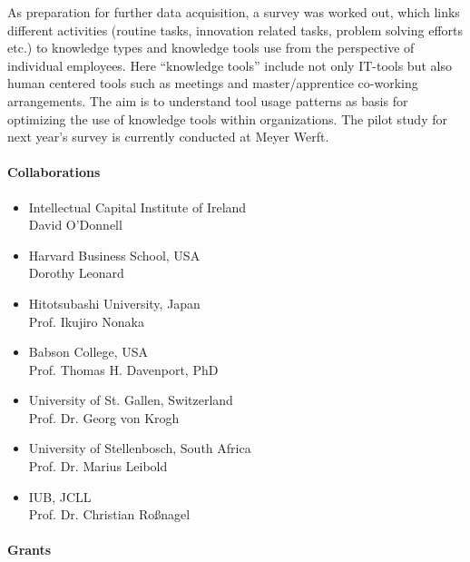  As preparation for further data acquisition, a survey was worked out, which links different activities (routine tasks, innovation related tasks, problem solving efforts etc.) to knowledge types and knowledge tools use from the perspective of individual employees. Here ``knowledge tools'' include not only IT-tools but also human centered tools such as meetings and master/apprentice co-working arrangements. The aim is to understand tool usage patterns as basis for optimizing the use of knowledge tools within organizations. The pilot study for next year's survey is currently conducted at Meyer Werft.

\newpage
\paragraph{Collaborations}
\begin{itemize}
\item Intellectual Capital Institute of Ireland  \\ David O'Donnell 
\item Harvard Business School, USA \\  Dorothy Leonard
\item Hitotsubashi University, Japan \\ Prof. Ikujiro Nonaka
\item Babson College, USA \\  Prof. Thomas H. Davenport, PhD
\item University of St. Gallen, Switzerland \\  Prof. Dr. Georg von Krogh
\item University of Stellenbosch, South Africa \\  Prof. Dr. Marius Leibold
\item IUB, JCLL \\  Prof. Dr. Christian Ro\ss nagel
\end{itemize}

\begin{bibunit}[apalike]
\nocite{*}
\putbib[profSvenVoelpel1]
\end{bibunit}


\paragraph{Grants}

